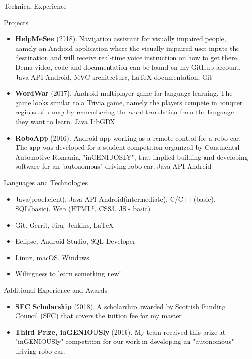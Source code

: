 \documentclass[]{mcdowellcv}
\begin{document}
	\begin{cvsection}{Technical Experience}
		\begin{cvsubsection}{Projects}{}{}
			\begin{itemize}
				\item \textbf{HelpMeSee} (2018). Navigation assistant for visually impaired people, namely an Android application where the visually impaired user inputs the destination and will receive real-time voice instruction on how to get there. Demo video, code and documentation can be found on my GitHub account. Java API Android, MVC architecture, LaTeX documentation, Git 
				\item \textbf{WordWar} (2017). Android multiplayer game for language learning. The game looks similar to a Trivia game, namely the players compete in conquer regions of a map by remembering the word translation from the language they want to learn. Java LibGDX 
				\item \textbf{RoboApp} (2016). Android app working as a remote control for a robo-car. The app was developed for a student competition organized by Continental Automotive Romania, "inGENIUOSLY", that implied building and developing software for an "autonomous" driving robo-car. Java API Android
			\end{itemize}
		\end{cvsubsection}
	\end{cvsection}
	
		
	\begin{cvsection}{Languages and Technologies}
		\begin{cvsubsection}{}{}{}	
			\begin{itemize}
				\item Java(proeficient), Java API Android(intermediate), C/C++(basic), SQL(basic), Web (HTML5, CSS3, JS - basic) 
				\item Git, Gerrit, Jira, Jenkins, LaTeX
				\item Eclipse, Android Studio, SQL Developer
				\item Linux, macOS, Windows
				\item Wilingness to learn something new!
			\end{itemize}
		\end{cvsubsection}
	\end{cvsection}

	\begin{cvsection}{Additional Experience and Awards}
		\begin{cvsubsection}{}{}{}	
			\begin{itemize}
				\item \textbf{SFC Scholarship} (2018). A scholarship awarded by Scottish Funding Council (SFC) that covers the tuition fee for my master
				\item \textbf{Third Prize, inGENIOUSly} (2016). My team received this prize at "inGENIOUSly" competition for our work in developing an "autonomous" driving robo-car. 
			\end{itemize}
		\end{cvsubsection}
	\end{cvsection}
\end{document}
